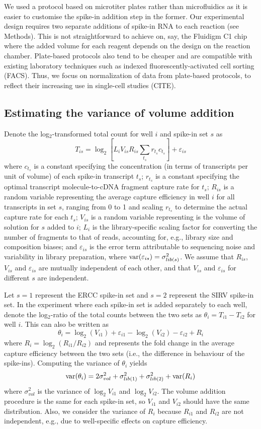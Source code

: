 \documentclass{article}
\begin{document}
We used a protocol based on microtiter plates rather than microfluidics as it is easier to customise the spike-in addition step in the former.
Our experimental design requires two separate additions of spike-in RNA to each reaction (see Methods).
This is not straightforward to achieve on, say, the Fluidigm C1 chip where the added volume for each reagent depends on the design on the reaction chamber.
Plate-based protocols also tend to be cheaper and are compatible with existing laboratory techniques such as indexed fluorescently-activated cell sorting (FACS).
Thus, we focus on normalization of data from plate-based protocols, to reflect their increasing use in single-cell studies (CITE).

\subsection{Estimating the variance of volume addition}
Denote the log$_2$-transformed total count for well $i$ and spike-in set $s$ as
\[
T_{is} = \log_2 \left[ L_i V_{is} R_{is} \sum_{t_s} r_{t_s} c_{t_s} \right] + \varepsilon_{is}
\]
where $c_{t_s}$ is a constant specifying the concentration (in terms of transcripts per unit of volume) of each spike-in transcript $t_s$;
$r_{t_s}$ is a constant specifying the optimal transcript molecule-to-cDNA fragment capture rate for $t_s$;
$R_{is}$ is a random variable representing the average capture efficiency in well $i$ for all transcripts in set $s$, ranging from 0 to 1 and scaling $r_{t_s}$ to determine the actual capture rate for each $t_s$;
$V_{is}$ is a random variable representing is the volume of solution for $s$ added to $i$;
$L_i$ is the library-specific scaling factor for converting the number of fragments to that of reads, accounting for, e.g., library size and composition biases;
and $\varepsilon_{is}$ is the error term attributable to sequencing noise and variability in library preparation, where $\mbox{var}(\varepsilon_{is})= \sigma^2_{lib(s)}$.
We assume that $R_{is}$, $V_{is}$ and $\varepsilon_{is}$ are mutually independent of each other, and that $V_{is}$ and $\varepsilon_{is}$ for different $s$ are independent.

Let $s=1$ represent the ERCC spike-in set and $s=2$ represent the SIRV spike-in set.
In the experiment where each spike-in set is added separately to each well, denote the log$_2$-ratio of the total counts between the two sets as $\theta_i = T_{i1} - T_{i2}$ for well $i$.
This can also be written as
\[
\theta_i = \log_2(V_{i1}) + \varepsilon_{i1} - \log_2(V_{i2}) - \varepsilon_{i2} + R_i
\]
where $R_i = \log_2(R_{i1}/R_{i2})$ and represents the fold change in the average capture efficiency between the two sets (i.e., the difference in behaviour of the spike-ins).
Computing the variance of $\theta_i$ yields
\[
\mbox{var}(\theta_i) = 2 \sigma^2_{vol} + \sigma^2_{lib(1)} + \sigma^2_{lib(2)} + \mbox{var}(R_i)
\]
where $\sigma^2_{vol}$ is the variance of $\log_2 V_{i1}$ and $\log_2 V_{i2}$.
The volume addition procedure is the same for each spike-in set, so $V_{i1}$ and $V_{i2}$ should have the same distribution.
Also, we consider the variance of $R_i$ because $R_{i1}$ and $R_{i2}$ are not independent, e.g., due to well-specific effects on capture efficiency.
\end{document}
